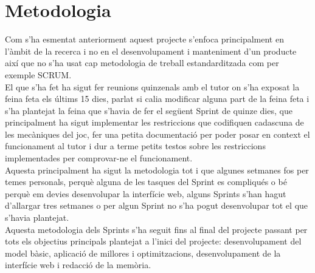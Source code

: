 


\chapter{Metodologia} %

\label{Metodologia} %

Com s'ha esmentat anteriorment aquest projecte s'enfoca principalment en l'àmbit de la recerca i no en el desenvolupament i manteniment d'un producte així que no s'ha usat cap metodologia de treball estandarditzada com per exemple SCRUM.\\

El que s'ha fet ha sigut fer reunions quinzenals amb el tutor on s'ha exposat la feina feta els últims 15 dies, parlat si calia modificar alguna part de la feina feta i s'ha plantejat la feina que s'havia de fer el següent Sprint de quinze dies, que principalment ha sigut implementar les restriccions que codifiquen cadascuna de les mecàniques del joc, fer una petita documentació per poder posar en context el funcionament al tutor i dur a terme petits testos sobre les restriccions implementades per comprovar-ne el funcionament.\\

Aquesta principalment ha sigut la metodologia tot i que algunes setmanes fos per temes personals, perquè alguna de les tasques del Sprint es compliqués o bé perquè em devies desenvolupar la interfície web, alguns Sprints s'han hagut d'allargar tres setmanes o per algun Sprint no s'ha pogut desenvolupar tot el que s'havia plantejat.\\
Aquesta metodologia dels Sprints s'ha seguit fins al final del projecte passant per tots els objectius principals plantejat a l'inici del projecte: desenvolupament del model bàsic, aplicació de millores i optimitzacions, desenvolupament de la interfície web i redacció de la memòria.\\



